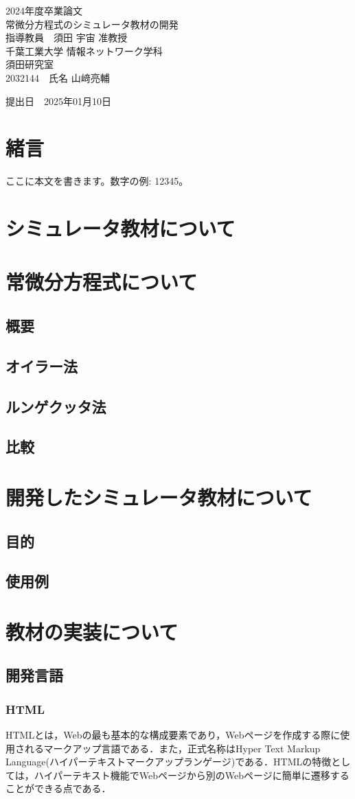\documentclass[a4paper, 12pt]{ltjsarticle}
\newcommand{\coverpage}{
\begin{titlepage}
\begin{center}
\vspace*{1.5cm}

{\LARGE 2024年度卒業論文}\\[2cm] %

{\Huge {常微分方程式のシミュレータ教材の開発}}\\[4cm] %

{\LARGE 指導教員　須田 宇宙 准教授}\\[2cm] %
{\LARGE 千葉工業大学 情報ネットワーク学科}\\[0.5cm] %

{\LARGE 須田研究室}\\[2.5cm] %

{\LARGE {2032144}　氏名 {山﨑亮輔}} \\[1.5cm] %

\vfill
\end{center}

\begin{flushright}
{\LARGE 提出日　\textnormal{2025年01月10日}}\\[1.5cm] %
\end{flushright}

\vfill
\end{titlepage}
}
\begin{document}
\coverpage

\tableofcontents

\clearpage

\section{緒言}
ここに本文を書きます。数字の例: 12345。
\clearpage
\section{シミュレータ教材について}
\clearpage
\section{常微分方程式について}
\subsection{概要}
\subsection{オイラー法}
\subsection{ルンゲクッタ法}
\subsection{比較}
\clearpage
\section{開発したシミュレータ教材について}
\subsection{目的}
\subsection{使用例}
\clearpage
\section{教材の実装について}
\subsection{開発言語}
\subsubsection{HTML}
HTMLとは，Webの最も基本的な構成要素であり，Webページを作成する際に使用されるマークアップ言語である．また，正式名称はHyper Text Markup Language(ハイパーテキストマークアップランゲージ)である．HTMLの特徴としては，ハイパーテキスト機能でWebページから別のWebページに簡単に遷移することができる点である．
\end{document}
